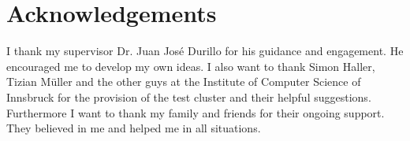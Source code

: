 \chapter*{Acknowledgements}
I thank my supervisor Dr. Juan José Durillo for his guidance and engagement. He encouraged me to develop my own ideas. I also want to thank Simon Haller, Tizian Müller and the other guys at the Institute of Computer Science of Innsbruck for the provision of the test cluster and their helpful suggestions. Furthermore I want to thank my family and friends for their ongoing support. They believed in me and helped me in all situations.